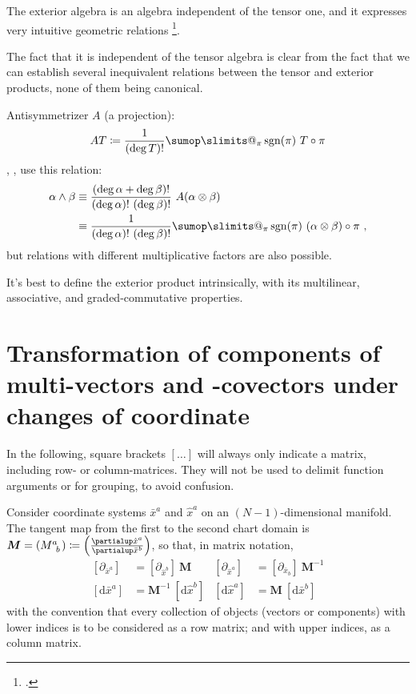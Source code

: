 \documentclass[\ifafour a4paper,12pt,\else a5paper,10pt,\fi%
onecolumn,oneside,article,%
british%
]{memoir}
\makeatletter
\theoremstyle{remark}
\theoremstyle{innote}
\def\sum{\DOTSI\sumop\slimits@}
\newcommand*{\citep}{\footcites}
\newcommand*{\de}{\partialup}%
\newcommand*{\di}{\mathrm{d}}%
\newcommand*{\defd}{\coloneqq}
\renewcommand*{\|}[1][]{\nonscript\,#1\vert\nonscript\;\mathopen{}}
\newcommand*{\cf}{{cf.}}
\DeclareMathOperator{\sgn}{sgn}
\newcommand*{\hx}{\hat{x}}
\newcommand*{\lx}{\bar{x}}
\renewcommand*{\i}{\indices}
\makeatother
\begin{document}
The exterior algebra is an algebra independent of the tensor one, and it
expresses very intuitive geometric relations
\citep[\cf][]{deschamps1970,deschamps1981}.

The fact that it is independent of the tensor algebra is clear from the
fact that we can establish several inequivalent relations between the tensor and
exterior products, none of them being canonical.


Antisymmetrizer $A$ (a projection):
\begin{equation}
  \label{eq:antisymmetrizer}
  AT \defd \frac{1}{(\deg T)!} \sum_{\pi}\sgn(\pi)\ T\circ\pi
\end{equation}
\textcite{abrahametal1983_r1988}, \textcite{choquetbruhatetal1977_r1996},
\textcite{bossavit1991} use this relation:
\begin{equation}
  \label{eq:wedge_marsden}
  \begin{split}
    \alpha \land \beta &\equiv
    \frac{(\deg \alpha+\deg \beta)!}{(\deg \alpha)!\ (\deg \beta)!}\ 
    A(\alpha \otimes \beta)
  \\
  &\equiv \frac{1}{(\deg \alpha)!\ (\deg \beta)!}
  \sum_{\pi}\sgn(\pi)\ (\alpha \otimes \beta)\circ\pi \ ,
\end{split}
\end{equation}
but relations with different multiplicative factors are also possible.

It's best to define the exterior product intrinsically, with its
multilinear, associative, and graded-commutative properties.



\section{Transformation of components of multi-vectors and -covectors under
  changes of coordinate}
\label{sec:comp_transf}

In the following, square brackets $[\dotso]$ will always only indicate a matrix,
including row- or column-matrices. They will not be used to delimit
function arguments or for grouping, to avoid confusion.

\bigskip

Consider coordinate systems $\lx^{a}$ and $\hx^{a}$ on an $(N-1)$-dimensional
manifold. The tangent map from the first to the second chart domain is
$\bm{M} = (M\i{^{a}_{b}}) \defd \Bigl(\frac{\de \hx^{a}}{\de \lx^{b}}\Bigr)$,
so that, in matrix notation,
\begin{align}
  \label{eq:base_coord_vec_tr}
  [\de_{\lx^{a}}] &=  [\de_{\hx^{b}}]\ \bm{M}
  &
    [\de_{\hx^{a}}] &= [\de_{\lx_{b}}]\ \bm{M}^{-1}
  \\
  \label{eq:base_coord_covec_tr}
  [\di \lx^{a}] &= \bm{M}^{-1}\ [\di\hx^{b}]
  &
    [\di\hx^{a}] &= \bm{M}\ [\di \lx^{b}]
\end{align}
with the convention that every collection of objects (vectors or
components) with lower indices is to be considered as a row matrix; and
with upper indices, as a column matrix.
\end{document}
